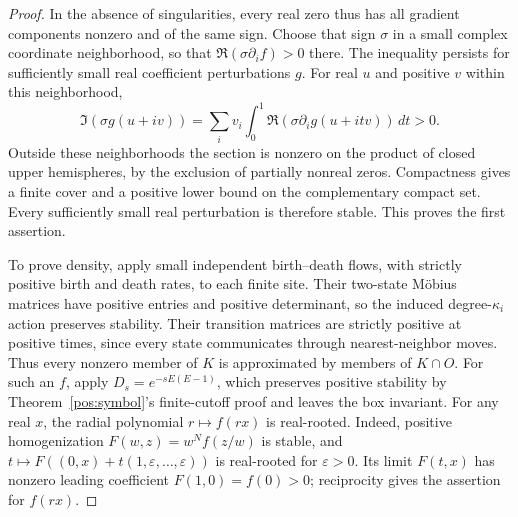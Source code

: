\documentclass[reqno]{amsart}
\theoremstyle{definition}
\theoremstyle{remark}
\begin{document}
\begin{proof}
In the absence of singularities, every real zero thus has all gradient components
nonzero and of the same sign.  Choose that sign \(\sigma\) in a small complex
coordinate neighborhood, so that \(\Re(\sigma\partial_i f)>0\) there.
The inequality persists for sufficiently small real coefficient perturbations \(g\).
For real \(u\) and positive \(v\) within this neighborhood,
\[
 \Im(\sigma g(u+iv))=
 \sum_i v_i\int_0^1\Re(\sigma\partial_i g(u+itv))\,dt>0.
\]
Outside these neighborhoods the section is nonzero on the product of closed upper
hemispheres, by the exclusion of partially nonreal zeros.  Compactness gives a
finite cover and a positive lower bound on the complementary compact set.
Every sufficiently small real perturbation is therefore stable.  This proves
the first assertion.

To prove density, apply small independent birth--death flows, with strictly positive
birth and death rates, to each finite site.  Their two-state M\"obius matrices have
positive entries and positive determinant, so the induced degree-\(\kappa_i\)
action preserves stability.  Their transition matrices are strictly positive at
positive times, since every state communicates through nearest-neighbor moves.
Thus every nonzero member of \(K\) is approximated by members of \(K\cap O\).
For such an \(f\), apply \(D_s=e^{-sE(E-1)}\), which preserves positive stability
by Theorem~\ref{pos:symbol}'s finite-cutoff proof and leaves the box invariant.
For any real \(x\), the radial polynomial \(r\mapsto f(rx)\) is real-rooted.
Indeed, positive homogenization \(F(w,z)=w^Nf(z/w)\) is stable, and
\(t\mapsto F((0,x)+t(1,\varepsilon,\ldots,\varepsilon))\) is real-rooted for
\(\varepsilon>0\).  Its limit \(F(t,x)\) has nonzero leading coefficient
\(F(1,0)=f(0)>0\); reciprocity gives the assertion for \(f(rx)\).


\end{proof}
\end{document}
